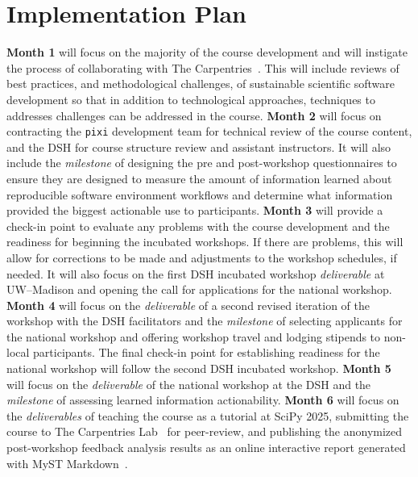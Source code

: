 \documentclass[letterpaper, 11pt]{article}
\newcommand{\institute}{UW--Madison}
\newcommand{\pixi}{\texttt{pixi}}
\begin{document}
\section{Implementation Plan}


\textbf{Month 1} will focus on the majority of the course development and will instigate the process of collaborating with The Carpentries~\cite{the_carpentries_org}.
This will include reviews of best practices, and methodological challenges, of sustainable scientific software development so that in addition to technological approaches, techniques to addresses challenges can be addressed in the course.
\textbf{Month 2} will focus on contracting the \pixi{} development team for technical review of the course content, and the DSH for course structure review and assistant instructors.
It will also include the \emph{milestone} of designing the pre and post-workshop questionnaires to ensure they are designed to measure the amount of information learned about reproducible software environment workflows and determine what information provided the biggest actionable use to participants.
\textbf{Month 3} will provide a check-in point to evaluate any problems with the course development and the readiness for beginning the incubated workshops.
If there are problems, this will allow for corrections to be made and adjustments to the workshop schedules, if needed.
It will also focus on the first DSH incubated workshop \emph{deliverable} at \institute{} and opening the call for applications for the national workshop.
\textbf{Month 4} will focus on the \emph{deliverable} of a second revised iteration of the workshop with the DSH facilitators and the \emph{milestone} of selecting applicants for the national workshop and offering workshop travel and lodging stipends to non-local participants.
The final check-in point for establishing readiness for the national workshop will follow the second DSH incubated workshop.
\textbf{Month 5} will focus on the \emph{deliverable} of the national workshop at the DSH and the \emph{milestone} of assessing learned information actionability.
\textbf{Month 6} will focus on the \emph{deliverables} of teaching the course as a tutorial at SciPy 2025, submitting the course to The Carpentries Lab~\cite{carpentries_lab} for peer-review, and publishing the anonymized post-workshop feedback analysis results as an online interactive report generated with MyST Markdown~\cite{executable_books_community}.
\end{document}
